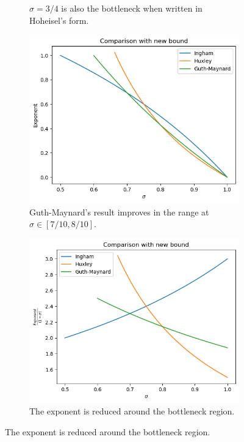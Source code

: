\begin{figure}[h]
\begin{subfigure}{0.4\textwidth}
        \caption{$\sigma=3/4$ is also the bottleneck when written in Hoheisel's form.}
    \end{subfigure}

    \centering
    \begin{subfigure}{0.4\textwidth}
        \includegraphics[width=\textwidth]{gm_1.png}
        \caption{Guth-Maynard's result improves in the range at $\sigma\in[7/10,8/10].$}
    \end{subfigure}
    \begin{subfigure}{0.4\textwidth}
        \includegraphics[width=\textwidth]{gm_2.png}
        \caption{The exponent is reduced around the bottleneck region.}
    \end{subfigure}
\end{figure}
